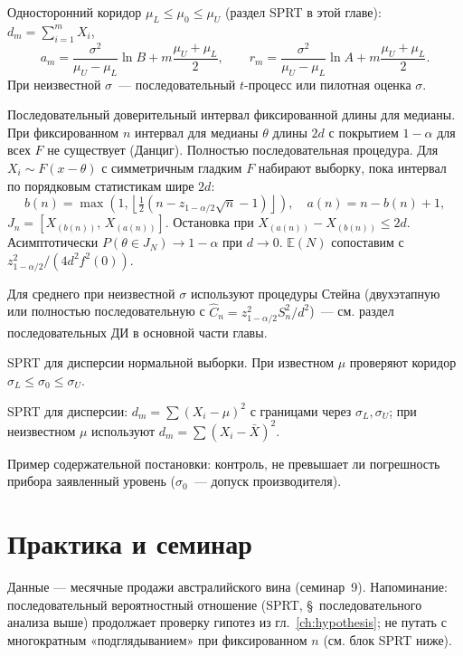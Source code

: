 Односторонний коридор $\mu_L\leq\mu_0\leq\mu_U$ (раздел SPRT в этой главе): $d_m=\sum_{i=1}^m X_i$, \[ a_m=\frac{\sigma^2}{\mu_U-\mu_L}\ln B+m\frac{\mu_U+\mu_L}{2},\qquad r_m=\frac{\sigma^2}{\mu_U-\mu_L}\ln A+m\frac{\mu_U+\mu_L}{2}.
\] При неизвестной $\sigma$~--- последовательный $t$-процесс или пилотная оценка $\sigma$.

Последовательный доверительный интервал фиксированной длины для медианы. При фиксированном $n$ интервал для медианы $\theta$ длины $2d$ с покрытием $1-\alpha$ для всех $F$ не существует (Данциг).
Полностью последовательная процедура. Для $X_i\sim F(x-\theta)$ с симметричным гладким $F$ набирают выборку, пока интервал по порядковым статистикам шире $2d$: \[ b(n)=\max\!\left(1,\left\lfloor\tfrac12(n-z_{1-\alpha/2}\sqrt{n}-1)\right\rfloor\right),\quad a(n)=n-b(n)+1, \] $J_n=[X_{(b(n))},\,X_{(a(n))}]$. Остановка при $X_{(a(n))}-X_{(b(n))}\leq 2d$.
Асимптотически $P(\theta\in J_N)\to 1-\alpha$ при $d\to 0$. $\mathbb{E}(N)$ сопоставим с $z_{1-\alpha/2}^2/(4d^2 f^2(0))$.

Для среднего при неизвестной $\sigma$ используют процедуры Стейна (двухэтапную или полностью последовательную с $\hat C_n=z_{1-\alpha/2}^2 S_n^2/d^2$)~--- см. раздел последовательных ДИ в основной части главы.

SPRT для дисперсии нормальной выборки. При известном $\mu$ проверяют коридор $\sigma_L\leq\sigma_0\leq\sigma_U$.

SPRT для дисперсии: $d_m=\sum(X_i-\mu)^2$ с границами через $\sigma_L,\sigma_U$; при неизвестном $\mu$ используют $d_m=\sum(X_i-\bar X)^2$.

Пример содержательной постановки: контроль, не превышает ли погрешность прибора заявленный уровень ($\sigma_0$~--- допуск производителя).

\section{Практика и семинар}
\label{sec:practice-ch6}


Данные --- месячные продажи австралийского вина (семинар~9).
Напоминание: последовательный вероятностный отношение (SPRT, \S~последовательного анализа выше) продолжает проверку гипотез из гл.~\ref{ch:hypothesis}; не путать с многократным «подглядыванием» при фиксированном $n$ (см. блок SPRT ниже).

